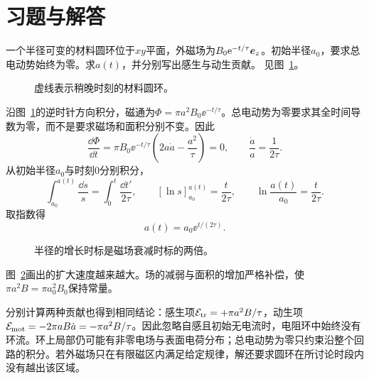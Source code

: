 \section{习题与解答}

\begin{exercise}[磁场减弱而总磁通不变]\label{ex:i1-h1}
一个半径可变的材料圆环位于$xy$平面，外磁场为$B_0\mathrm e^{-t/\tau}\bm{e}_z$。初始半径$a_0$，要求总电动势始终为零。求$a(t)$，并分别写出感生与动生贡献。 见图~\ref{fig:i1-h1-q}。
\end{exercise}

\begin{figure}[H]\centering
{}
\caption{虚线表示稍晚时刻的材料圆环。}\label{fig:i1-h1-q}
\end{figure}
\begin{solution}
沿图~\ref{fig:i1-h1-q}的逆时针方向积分，磁通为$\Phi=\pi a^2B_0\ee^{-t/\tau}$。总电动势为零要求其全时间导数为零，而不是要求磁场和面积分别不变。因此
\[\frac{\dd\Phi}{\dd t}=\pi B_0\ee^{-t/\tau}
\left(2a\dot a-\frac{a^2}{\tau}\right)=0,\qquad
\frac{\dot a}{a}=\frac1{2\tau}.
\]
从初始半径$a_0$与时刻$0$分别积分，
\[\int_{a_0}^{a(t)}\frac{\dd s}s=\int_0^t\frac{\dd t'}{2\tau},\qquad
[\ln s]_{a_0}^{a(t)}=\frac{t}{2\tau},\qquad
\ln\frac{a(t)}{a_0}=\frac{t}{2\tau}.\]
取指数得
\[\boxed{a(t)=a_0\ee^{t/(2\tau)}}.
\]

\begin{figure}[H]\centering
{}
\caption{半径的增长时标是磁场衰减时标的两倍。}\label{fig:i1-h1-s}
\end{figure}

图~\ref{fig:i1-h1-s}画出的扩大速度越来越大。场的减弱与面积的增加严格补偿，使$\pi a^2B=\pi a_0^2B_0$保持常量。

分别计算两种贡献也得到相同结论：感生项$\mathcal E_{\rm tr}=+\pi a^2B/\tau$，动生项$\mathcal E_{\rm mot}=-2\pi aB\dot a=-\pi a^2B/\tau$。因此忽略自感且初始无电流时，电阻环中始终没有环流。环上局部仍可能有非零电场与表面电荷分布；总电动势为零只约束沿整个回路的积分。若外磁场只在有限磁区内满足给定规律，解还要求圆环在所讨论时段内没有越出该区域。
\end{solution}

